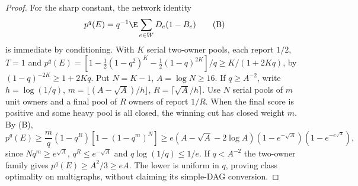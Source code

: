 \begin{proof}
For the sharp constant, the network identity
\[
 p^q(E)=q^{-1}\E\sum_{e\in W}D_e(1-B_e)                 \tag{B}
\]
is immediate by conditioning. With $K$ serial two-owner pools, each report
$1/2$, $T=1$ and
$p^q(E)=[1-\tfrac12(1-q^2)^K-\tfrac12(1-q)^{2K}]/q
\ge K/(1+2Kq)$, by $(1-q)^{-2K}\ge1+2Kq$.
Put $N=K-1$, $A=\log N\ge16$. If $q\ge A^{-2}$, write
$h=\log(1/q)$, $m=\lfloor(A-\sqrt A)/h\rfloor$,
$R=\lceil\sqrt A/h\rceil$. Use $N$ serial pools of $m$ unit owners
and a final pool of $R$ owners of report $1/R$.
When the final score is positive and some heavy pool is all closed, the
winning cut has closed weight $m$. By (B),
\[
 p^q(E)\ge\frac m q(1-q^R)[1-(1-q^m)^N]
 \ge e(A-\sqrt A-2\log A)(1-e^{-\sqrt A})(1-e^{-e^{\sqrt A}}),
\]
since $Nq^m\ge e^{\sqrt A}$, $q^R\le e^{-\sqrt A}$ and
$q\log(1/q)\le1/e$. If $q<A^{-2}$ the two-owner family gives
$p^q(E)\ge A^2/3\ge eA$. The lower is uniform in $q$, proving class
optimality on multigraphs, without claiming its simple-DAG conversion.
\end{proof}

